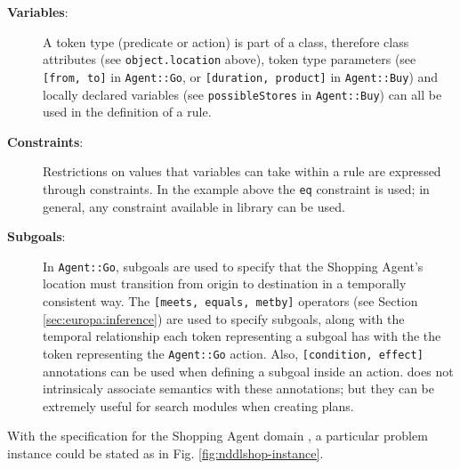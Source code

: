 \begin{description}

\item[\textbf{Variables}:] A token type (predicate or action) is part
  of a class, therefore class attributes (see \texttt{object.location}
  above), token type parameters (see \texttt{[from, to]} in
  \texttt{Agent::Go}, or \texttt{[duration, product]} in
  \texttt{Agent::Buy}) and locally declared variables (see
  \texttt{possibleStores} in \texttt{Agent::Buy}) can all be used in
  the definition of a rule.

\item[\textbf{Constraints}:] Restrictions on values that variables can
  take within a rule are expressed through constraints. In the example
  above the \texttt{eq} constraint is used; in general, any constraint
  available in \eus library can be used.

\item[\textbf{Subgoals}:] In \texttt{Agent::Go}, subgoals are used to
  specify that the Shopping Agent's location must transition from
  origin to destination in a temporally consistent way. The
  \texttt{[meets, equals, metby]} operators (see Section
  \ref{sec:europa:inference}) are used to specify subgoals, along with
  the temporal relationship each token representing a subgoal has with
  the the token representing the \texttt{Agent::Go} action. Also,
  \texttt{[condition, effect]} annotations can be used when defining a
  subgoal inside an action. \eu does not intrinsicaly associate semantics
  with these annotations; but they can be extremely useful for search
  modules when creating plans.

\end{description}

With the specification for the Shopping Agent domain ,
a particular problem instance could be stated as in
Fig. \ref{fig:nddlshop-instance}.

